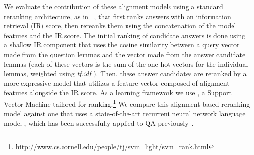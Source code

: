 We evaluate the contribution of these alignment models using a standard reranking architecture, as in ~\citet{jansen14}, that first ranks answers with an information retrieval (IR) score, then rereanks them using the concatenation of the model features and the IR score.
The initial ranking of candidate answers is done using a shallow IR component that uses the cosine similarity between a query vector made from the question lemmas and the vector made from the answer candidate lemmas (each of these vectors is the sum of the one-hot vectors for the individual lemmas, weighted using {\em tf.idf} \citep[Ch. 6,][]{manning08}).
Then, these answer candidates are reranked by a more expressive model that utilizes a feature vector composed of alignment features alongside the IR score.  As a learning framework we use \svmr , a Support Vector Machine tailored for ranking.\footnote{ \url{http://www.cs.cornell.edu/people/tj/svm_light/svm_rank.html}}
We compare this alignment-based reranking model against one that uses a state-of-the-art recurrent neural network language model \citep{mikolov10,mikolov13}, which has been successfully applied to QA previously~\citep[e.g.,][]{yih13}.


